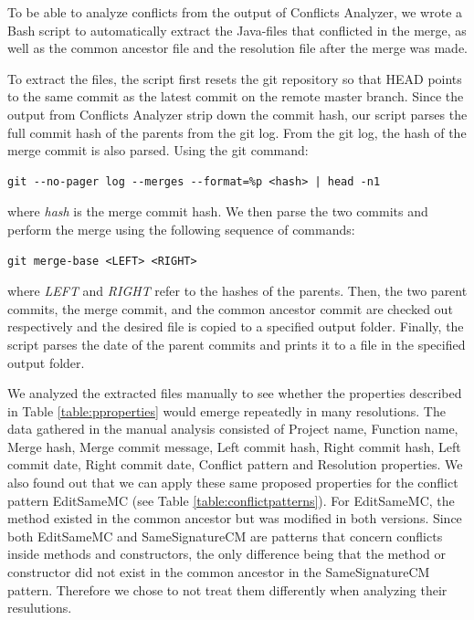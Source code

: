 To be able to analyze conflicts from the output of Conflicts Analyzer, we wrote a Bash script to automatically extract the Java-files that conflicted in the merge, as well as the common ancestor file and the resolution file after the merge was made.

To extract the files, the script first resets the git repository so that HEAD points to the same commit as the latest commit on the remote master branch. Since the output from Conflicts Analyzer strip down the commit hash, our script parses the full commit hash of the parents from the git log. From the git log, the hash of the merge commit is also parsed. Using the git command:
\lstset{language=Bash,numbers=left,xleftmargin=2em,frame=single,framexleftmargin=1.5em}
\begin{lstlisting}[frame=single,breaklines=true,tabsize=2]
git --no-pager log --merges --format=%p <hash> | head -n1
\end{lstlisting}
where \textit{hash} is the merge commit hash. We then parse the two commits and perform the merge using the following sequence of commands:\\
\lstset{language=Bash,numbers=left,xleftmargin=2em,frame=single,framexleftmargin=1.5em}
\begin{lstlisting}[frame=single,breaklines=true,tabsize=2]
git merge-base <LEFT> <RIGHT>
\end{lstlisting}
where \textit{LEFT} and \textit{RIGHT} refer to the hashes of the parents.  Then, the two parent commits, the merge commit, and the common ancestor commit are checked out respectively and the desired file is copied to a specified output folder. Finally, the script parses the date of the parent commits and prints it to a file in the specified output folder.

We analyzed the extracted files manually to see whether the properties described in Table \ref{table:pproperties} would emerge repeatedly in many resolutions. The data gathered in the manual analysis consisted of Project name, Function name, Merge hash, Merge commit message, Left commit hash, Right commit hash, Left commit date, Right commit date, Conflict pattern and Resolution properties. We also found out that we can apply these same proposed properties for the conflict pattern EditSameMC (see Table \ref{table:conflictpatterns}). For EditSameMC, the method existed in the common ancestor but was modified in both versions. Since both EditSameMC and SameSignatureCM are patterns that concern conflicts inside methods and constructors, the only difference being that the method or constructor did not exist in the common ancestor in the SameSignatureCM pattern. Therefore we chose to not treat them differently when analyzing their resulutions.
\FloatBarrier
